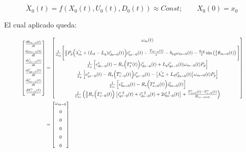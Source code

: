 \documentclass[blue,fullpaper]{ludusofficial}  %
\begin{document}
\begin{equation}
\label{eq:punto-operacion}
\dot{X}_0(t)=f(X_0(t), U_0(t), D_0(t))\approx Const; \qquad X_0(0)=x_0
\end{equation}

El cual aplicado queda:


\begin{equation}
\label{eq:punto-operacion-desarrollado}
\resizebox{\dimexpr\linewidth-3em\relax}{!}{ $\displaystyle
\begin{aligned}
\begin{bmatrix}
    \frac{d\theta_{m-0}(t)}{dt} \\[2mm]
    \frac{d\omega_{m-0}(t)}{dt} \\[2mm]
    \frac{di_{ds-0}^{r}(t)}{dt} \\[2mm]
    \frac{di_{qs-0}^{r}(t)}{dt} \\[2mm]
    \frac{di_{0s-0}^{r}(t)}{dt} \\[2mm]
    \frac{dT_{s-0}^{\circ}(t)}{dt}
\end{bmatrix} 
&= 
\begin{bmatrix}
    \omega_m(t) \\[2mm]
    \frac{1}{J_{eq}} \Bigg[ \frac{3}{2}P_{p}\Big( \lambda_{m}^{'r} + ( L_{d} - L_{q} ) i_{ds-0}^{r}(t)\Big)i_{qs-0}^{r}(t)  - \frac{T_{dl-0}(t)}{r} - b_{eq}  \omega_{m-0}(t) - \frac{k_{l}g}{r} \sin \left(  \frac{1}{r} \theta_{m-0}(t) \right) \Bigg] \\[2mm]
    \frac{1}{L_{d}} \left[ v_{ds-0}^{r}(t) - R_{s} \Big( T_{s}^{\circ} (t) \Big) i_{ds-0}^{r}(t) + L_{q}i_{qs-0}^{r}(t) \omega_{m-0}(t)P_{p}  \right] \\[2mm]
    \frac{1}{L_{q} } \left[ v_{qs-0}^{r}(t) - R_{s} \Big( T_{s-0}^{\circ} (t) \Big) i_{qs-0}^{r}(t) - \big[ \lambda_{m}^{'r} + L_{d} i_{ds-0}^{r}(t) \big] \omega_{m-0}(t)P_{p} \right] \\[2mm]
    \frac{1}{ L_{ls} } \left[ v_{0s-0}^{r}(t) - R_{s} \Big( T_{s-0}^{\circ} (t) \Big) i_{0s-0}^{r}(t) \right] \\[2mm]
    \frac{1}{C_{ts}} \left( \frac{3}{2} R_s\Big( T_{s-0}^{\circ}(t) \Big) \left[ i_{qs-0}^{r \; 2}(t) + i_{ds-0}^{r \; 2}(t) + 2i_{0s-0}^{r \; 2}(t) \right] + \frac{T_{amb}^{\circ}(t) - T_{s-0}^{\circ}(t)}{R_{ts-amb}} \right)
\end{bmatrix} \\ 
&= 
\begin{bmatrix}
    \omega_{m-0} \\[2mm]
    0 \\[2mm]
    0 \\[2mm]
    0 \\[2mm]
    0 \\[2mm]
    0
\end{bmatrix}
\end{aligned}
$}
\end{equation}
\end{document}
